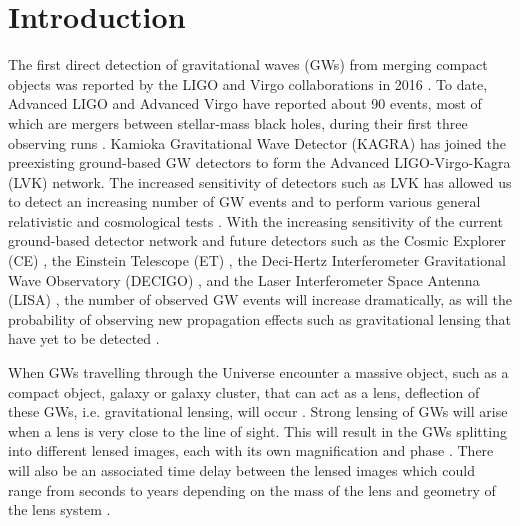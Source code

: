 \documentclass[floats,floatfix,showpacs,amssymb,prd,twocolumn,superscriptaddress,nofootinbib,nolongbibliography,reprint]{revtex4-2}
\begin{document}
\section{\label{sec:Introduction} Introduction}

The first direct detection of gravitational waves (GWs) from merging compact objects was reported by the LIGO and Virgo collaborations in 2016 \cite{2016}. To date, Advanced LIGO \cite{LIGOScientific:2014pky} and Advanced Virgo \cite{VIRGO:2014yos} have reported about 90 events, most of which are mergers between stellar-mass black holes, during their first three observing runs \cite{abbott2021gwtc-3}. Kamioka Gravitational Wave Detector (KAGRA) \cite{Somiya:2011np, PhysRevD.88.043007, KAGRA:2020tym} has joined the preexisting ground-based GW detectors to form the Advanced LIGO-Virgo-Kagra (LVK) network. The increased sensitivity of detectors such as LVK has allowed us to detect an increasing number of GW events and to perform various general relativistic and cosmological tests \cite{abbott2021tests, ligo2021constraints}. With the increasing sensitivity of the current ground-based detector network and future detectors such as the Cosmic Explorer (CE) \cite{evans2021horizon}, the Einstein Telescope (ET) \cite{Maggiore:2019uih}, the Deci-Hertz Interferometer Gravitational Wave Observatory (DECIGO) \cite{Kawamura:2020pcg}, and the Laser Interferometer Space Antenna (LISA) \cite{Barausse:2020rsu}, the number of observed GW events will increase dramatically, as will the probability of observing new propagation effects such as gravitational lensing that have yet to be detected \cite{abbott2021search}. 

When GWs travelling through the Universe encounter a massive object, such as a compact object, galaxy or galaxy cluster, that can act as a lens, deflection of these GWs, i.e. gravitational lensing, will occur \cite{1971NCimB...6..225L, 1974IJTP....9..425O, 1999PThPS.133..137N, PhysRevLett.80.1138, Takahashi_2003,Oguri:2018muv, Li:2018prc}. Strong lensing of GWs will arise when a lens is very close to the line of sight. This will result in the GWs splitting into different lensed images, each with its own magnification and phase \cite{Takahashi_2003, Ezquiaga_2021}. There will also be an associated time delay between the lensed images which could range from seconds to years depending on the mass of the lens and geometry of the lens system \cite{1985A&A...143..413S, 1992grle.book.....S}.
 
\end{document}
